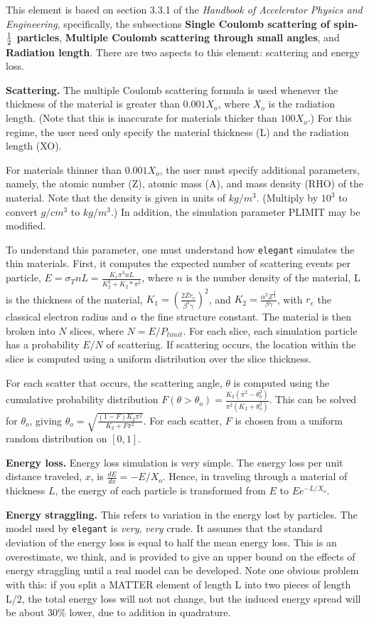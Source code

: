 This element is based on section 3.3.1 of the {\em Handbook of
Accelerator Physics and Engineering}, specifically, the
subsections {\bf Single Coulomb scattering of spin-${\rm \frac{1}{2}}$
particles}, {\bf Multiple Coulomb scattering through small angles},
and {\bf Radiation length}.
There are two aspects to this element: scattering and energy loss.

{\bf Scattering.}  The multiple Coulomb scattering formula is used
whenever the thickness of the material is greater than $0.001 X_o$,
where $X_o$ is the radiation length.  (Note that this is inaccurate
for materials thicker than $100 X_o$.)  For this regime, the user need
only specify the material thickness (L) and the radiation length (XO).

For materials thinner than $0.001 X_o$, the user must specify
additional parameters, namely, the atomic number (Z), atomic mass (A),
and mass density (RHO) of the material.  Note that the density is
given in units of $kg/m^3$.  (Multiply by $10^3$ to convert $g/cm^3$
to $kg/m^3$.)  In addition, the simulation parameter PLIMIT may be
modified.  

To understand this parameter, one must understand how {\tt elegant}
simulates the thin materials.  First, it computes the expected number
of scattering events per particle, $ E = \sigma_T n L = \frac{K_1
\pi^3 n L}{K_2^2 + K_2*\pi^2} $, where $n$ is the number density of
the material, L is the thickness of the material, $K_1 = (\frac{2 Z
r_e}{\beta^2 \gamma})^2$, and $K_2 = \frac{\alpha^2
Z^\frac{2}{3}}{\beta\gamma}$, with $r_e$ the classical electron radius
and $\alpha$ the fine structure constant.  The material is then broken
into $N$ slices, where $N = E/P_{limit}$.  For each slice, each
simulation particle has a probability $E/N$ of scattering.  If scattering
occurs, the location within the slice is computed using a uniform
distribution over the slice thickness.

For each scatter that occurs, the scattering angle, $\theta$ is
computed using the cumulative probability distribution
$F(\theta>\theta_o) = \frac{K_2 (\pi^2 - \theta_o^2)}{\pi^2 (K_2 +
\theta_o^2)}$.  This can be solved for $\theta_o$, giving
$\theta_o = \sqrt{\frac{(1-F)K_2\pi^2}{K_2 + F \pi^2}}$.  For each scatter,
$F$ is chosen from a uniform random distribution on $[0,1]$.

{\bf Energy loss.}  Energy loss simulation is very simple.
The energy loss per unit distance traveled, $x$, is 
$\frac{dE}{dx} = -E/X_o$.  Hence, in traveling through a
material of thickness $L$, the energy of each particle is
transformed from $E$ to $E e^{-L/X_o}$.  

{\bf Energy straggling.} This refers to variation in the energy lost
by particles.  The model used by {\tt elegant} is {\em very}, {\em
very} crude.  It assumes that the standard deviation of the energy
loss is equal to half the mean energy loss.  This is an overestimate,
we think, and is provided to give an upper bound on the effects of
energy straggling until a real model can be developed.  Note one
obvious problem with this: if you split a MATTER element of length L
into two pieces of length L/2, the total energy loss will not not
change, but the induced energy spread will be about 30\% lower, due to
addition in quadrature.
